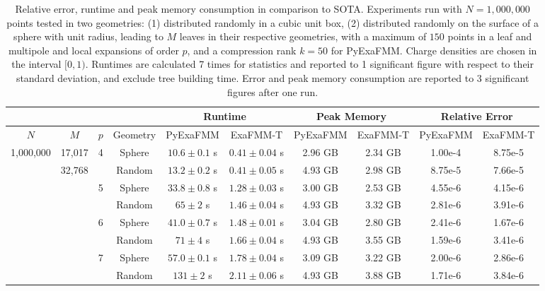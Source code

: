 \documentclass{IEEEcsmag}
\begin{document}
\begin{table}[t]
	\centering
	\caption{Relative error, runtime and peak memory consumption in comparison to SOTA. Experiments run with $N=1,000,000$ points tested in two geometries: (1) distributed randomly in a cubic unit box, (2) distributed randomly on the surface of a sphere with unit radius, leading to $M$ leaves in their respective geometries, with a maximum of $150$ points in a leaf and multipole and local expansions of order $p$, and a compression rank $k=50$ for PyExaFMM. Charge densities are chosen in the interval $[0, 1)$. Runtimes are calculated 7 times for statistics and reported to 1 significant figure with respect to their standard deviation, and exclude tree building time. Error and peak memory consumption are reported to 3 significant figures after one run.}
	\begin{tabular}{|*{10}{c|}}
		\hline
		& & &   & \multicolumn{2}{c|}{Runtime} & \multicolumn{2}{c|}{Peak Memory} & \multicolumn{2}{c|}{Relative Error}\\
		\hline
		$N$ & $M$ &$p$ &  Geometry   &   PyExaFMM  &  ExaFMM-T &    PyExaFMM  &  ExaFMM-T  &   PyExaFMM  &  ExaFMM-T\\
		\hline
		1,000,000 & 17,017 & 4   &   Sphere  &  $10.6 \pm 0.1$ s & $0.41 \pm 0.04$ s  &  2.96 GB  &   2.34 GB  & 1.00e-4 & 8.75e-5\\
		 & 32,768 &    &   Random  &  $13.2 \pm 0.2$ s &  $0.41 \pm 0.05$ s &  4.93 GB  &   2.98 GB  & 8.75e-5 & 7.66e-5\\
		&  & 5   &   Sphere  &    $33.8 \pm 0.8$ s & $1.28 \pm 0.03$ s &  3.00 GB  &  2.53 GB  & 4.55e-6 & 4.15e-6\\
		 &  &   &   Random  &  $65 \pm 2$ s &    $1.46 \pm 0.04$ s  &  4.93 GB  &   3.32 GB  & 2.81e-6 & 3.91e-6\\
		 &  & 6   &   Sphere  &  $41.0 \pm 0.7$ s &   $1.48 \pm 0.01$ s  &  3.04 GB  &   2.80 GB  & 2.41e-6 & 1.67e-6\\
		 &  &    &   Random  &  $71 \pm 4$ s &   $1.66 \pm 0.04$ s  &  4.93 GB  &   3.55 GB  & 1.59e-6 & 3.41e-6\\
		 &  & 7   &   Sphere  &  $57.0 \pm 0.1$ s &  $1.78 \pm 0.04$ s  &  3.09 GB  &   3.22 GB  & 2.00e-6 & 2.86e-6\\
		 &  &    &   Random  & $131 \pm 2$ s &   $2.11 \pm 0.06$ s  &  4.93 GB  &   3.88 GB  & 1.71e-6 & 3.84e-6\\
		\hline
	\end{tabular}
	\label{tab:performance}
 \end{table}
\end{document}
